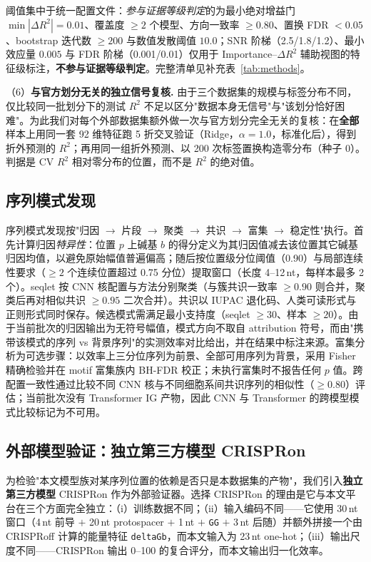 阈值集中于统一配置文件：\emph{参与证据等级判定}的为最小绝对增益门 $\min|\Delta R^{2}|=0.01$、覆盖度 $\ge 2$ 个模型、方向一致率 $\ge 0.80$、置换 FDR $<0.05$、bootstrap 迭代数 $\ge 200$ 与数值发散阈值 $10.0$；SNR 阶梯（2.5/1.8/1.2）、最小效应量 $0.005$ 与 FDR 阶梯（0.001/0.01）仅用于 Importance--$\Delta R^{2}$ 辅助视图的特征级标注，\textbf{不参与证据等级判定}。完整清单见补充表~\ref{tab:methods}。

（6）\textbf{与官方划分无关的独立信号复核.} 由于三个数据集的规模与标签分布不同，仅比较同一批划分下的测试 $R^{2}$ 不足以区分"数据本身无信号"与"该划分恰好困难"。为此我们对每个外部数据集额外做一次与官方划分完全无关的复核：在\textbf{全部}样本上用同一套 92 维特征跑 5 折交叉验证（Ridge，$\alpha=1.0$，标准化后），得到折外预测的 $R^{2}$；再用同一组折外预测、以 200 次标签置换构造零分布（种子 0）。判据是 CV $R^{2}$ 相对零分布的位置，而不是 $R^{2}$ 的绝对值。

\subsection{序列模式发现}

序列模式发现按"归因 $\rightarrow$ 片段 $\rightarrow$ 聚类 $\rightarrow$ 共识 $\rightarrow$ 富集 $\rightarrow$ 稳定性"执行。首先计算归因\emph{特异性}：位置 $p$ 上碱基 $b$ 的得分定义为其归因值减去该位置其它碱基归因均值，以避免原始幅值普遍偏高；随后按位置级分位阈值（0.90）与局部连续性要求（$\ge 2$ 个连续位置超过 0.75 分位）提取窗口（长度 4--12\,nt，每样本最多 2 个）。seqlet 按 CNN 核配置与方法分别聚类（与簇共识一致率 $\ge0.90$ 则合并，聚类后再对相似共识 $\ge0.95$ 二次合并）。共识以 IUPAC 退化码、人类可读形式与正则形式同时保存。候选模式需满足最小支持度（seqlet $\ge30$、样本 $\ge20$）。由于当前批次的归因输出为无符号幅值，模式方向不取自 attribution 符号，而由"携带该模式的序列 vs 背景序列"的实测效率对比给出，并在结果中标注来源。富集分析为可选步骤：以效率上三分位序列为前景、全部可用序列为背景，采用 Fisher 精确检验并在 motif 富集族内 BH-FDR 校正；未执行富集时不报告任何 $p$ 值。跨配置一致性通过比较不同 CNN 核与不同细胞系间共识序列的相似性（$\ge0.80$）评估；当前批次没有 Transformer IG 产物，因此 CNN 与 Transformer 的跨模型模式比较标记为不可用。

\subsection{外部模型验证：独立第三方模型 CRISPRon}
\label{sec:methods-external}

为检验"本文模型族对某序列位置的依赖是否只是本数据集的产物"，我们引入\textbf{独立第三方模型} CRISPRon \citep{Xiang2021NatCommun} 作为外部验证器。选择 CRISPRon 的理由是它与本文平台在三个方面完全独立：（i）训练数据不同；（ii）输入编码不同——它使用 30\,nt 窗口（4\,nt 前导 $+$ 20\,nt protospacer $+$ 1\,nt $+$ \texttt{GG} $+$ 3\,nt 后随）并额外拼接一个由 CRISPRoff 计算的能量特征 \texttt{deltaGb}，而本文输入为 23\,nt one-hot；（iii）输出尺度不同——CRISPRon 输出 0--100 的复合评分，而本文输出归一化效率。

